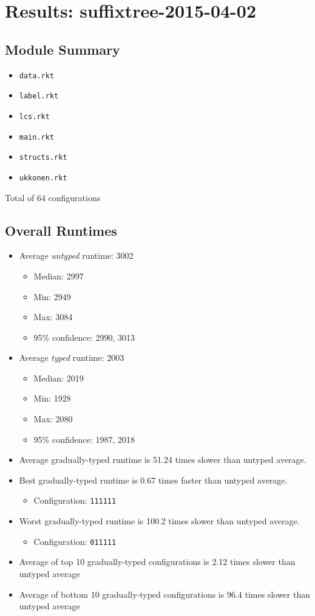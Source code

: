 \documentclass{article}
\newcommand{\mono}[1]{\texttt{#1}}
\begin{document}
\section{Results: suffixtree-2015-04-02}

\subsection{Module Summary}
\begin{itemize}
\item \mono{data.rkt}
\item \mono{label.rkt}
\item \mono{lcs.rkt}
\item \mono{main.rkt}
\item \mono{structs.rkt}
\item \mono{ukkonen.rkt}\end{itemize}
Total of 64 configurations

\subsection{Overall Runtimes}
\begin{itemize}
\item Average \emph{untyped} runtime: 3002
  \begin{itemize}
  \item Median: 2997
  \item Min: 2949
  \item Max: 3084
  \item 95\% confidence: 2990, 3013
  \end{itemize}
\item Average \emph{typed} runtime: 2003
  \begin{itemize}
  \item Median: 2019
  \item Min: 1928
  \item Max: 2080
  \item 95\% confidence: 1987, 2018
  \end{itemize}
\item Average gradually-typed runtime is 51.24 times slower than untyped average.
\item Best gradually-typed runtime is 0.67 times faster than untyped average.
\begin{itemize}\item Configuration: \mono{111111}\end{itemize}
\item Worst gradually-typed runtime is 100.2 times slower than untyped average.
\begin{itemize}\item Configuration: \mono{011111}\end{itemize}
\item Average of top 10 gradually-typed configurations is 2.12 times slower than untyped average
\item Average of bottom 10 gradually-typed configurations is 96.4 times slower than untyped average
\end{itemize}
\end{document}

